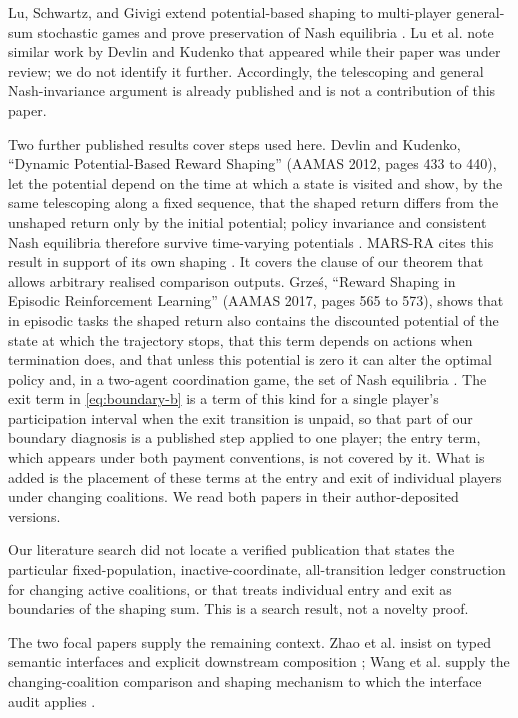 \documentclass{article}
\begin{document}
Lu, Schwartz, and Givigi extend potential-based shaping to multi-player general-sum stochastic games and prove preservation of Nash equilibria \cite{lu2011policy}. Lu et al. note similar work by Devlin and Kudenko that appeared while their paper was under review; we do not identify it further. Accordingly, the telescoping and general Nash-invariance argument is already published and is not a contribution of this paper.

Two further published results cover steps used here. Devlin and Kudenko, ``Dynamic Potential-Based Reward Shaping'' (AAMAS 2012, pages 433 to 440), let the potential depend on the time at which a state is visited and show, by the same telescoping along a fixed sequence, that the shaped return differs from the unshaped return only by the initial potential; policy invariance and consistent Nash equilibria therefore survive time-varying potentials \cite{devlin2012dynamic}. MARS-RA cites this result in support of its own shaping \cite{wang2026marsra}. It covers the clause of our theorem that allows arbitrary realised comparison outputs. Grze\'s, ``Reward Shaping in Episodic Reinforcement Learning'' (AAMAS 2017, pages 565 to 573), shows that in episodic tasks the shaped return also contains the discounted potential of the state at which the trajectory stops, that this term depends on actions when termination does, and that unless this potential is zero it can alter the optimal policy and, in a two-agent coordination game, the set of Nash equilibria \cite{grzes2017reward}. The exit term in \eqref{eq:boundary-b} is a term of this kind for a single player's participation interval when the exit transition is unpaid, so that part of our boundary diagnosis is a published step applied to one player; the entry term, which appears under both payment conventions, is not covered by it. What is added is the placement of these terms at the entry and exit of individual players under changing coalitions. We read both papers in their author-deposited versions.

Our literature search did not locate a verified publication that states the particular fixed-population, inactive-coordinate, all-transition ledger construction for changing active coalitions, or that treats individual entry and exit as boundaries of the shaping sum. This is a search result, not a novelty proof.

The two focal papers supply the remaining context. Zhao et al. insist on typed semantic interfaces and explicit downstream composition \cite{zhao2026learning}; Wang et al. supply the changing-coalition comparison and shaping mechanism to which the interface audit applies \cite{wang2026marsra}.
\end{document}
